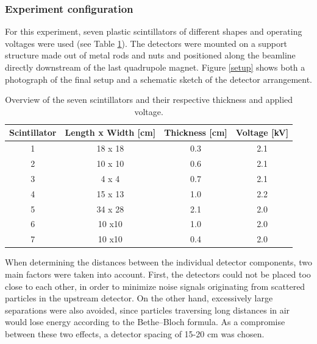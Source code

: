 \documentclass[11pt,a4paper]{article}
\begin{document}
\subsubsection{Experiment configuration}
\label{config}
For this experiment, seven plastic scintillators of different shapes and operating voltages were used (see Table \ref{tab: scint}). The detectors were mounted on a support structure made  out of metal rods and nuts and positioned along the beamline directly downstream of the last quadrupole magnet. Figure \ref{setup} shows both a photograph of the final setup and a schematic sketch of the detector arrangement.
\begin{table}[h!]
    \centering
    \begin{tabular}{|c|c|c|c|}
    \hline
       Scintillator & Length x Width [cm] & Thickness [cm] & Voltage [kV]\\ \hline
       1 & 18 x 18 & 0.3 & 2.1 \\ \hline
       2 & 10 x 10& 0.6 & 2.1 \\ \hline
       3 & 4 x 4& 0.7 & 2.1 \\ \hline
       4 & 15 x 13 &1.0 & 2.2 \\ \hline
       5 & 34 x 28& 2.1 & 2.0 \\ \hline
       6 & 10 x10 &1.0 & 2.0 \\ \hline
       7 & 10 x10&0.4 & 2.0 \\ \hline  
    \end{tabular}
    \caption{Overview of the seven scintillators and their respective thickness and applied voltage.}

    \label{tab: scint}
\end{table}

When determining the distances between the individual detector components, two main factors were taken into account. First, the detectors could not be placed too close to each other, in order to minimize noise signals originating from scattered particles in the upstream detector. On the other hand, excessively large separations were also avoided, since particles traversing long distances in air would lose energy according to the Bethe–Bloch formula. As a compromise between these two effects, a detector spacing of 15-20 cm was chosen.
\end{document}
